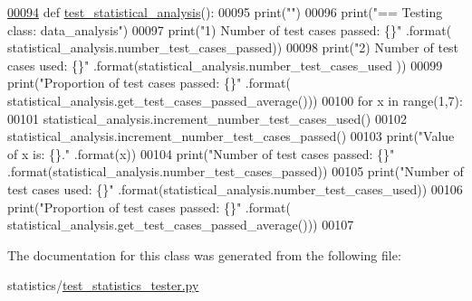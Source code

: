 \begin{DoxyCode}
\hypertarget{classstatistics_1_1test__statistics__tester_1_1statistical__analysis__tester_l00094}{}\hyperlink{classstatistics_1_1test__statistics__tester_1_1statistical__analysis__tester_ad05a0d6e83aaba083bfba6212ec0b971}{00094}     \textcolor{keyword}{def }\hyperlink{classstatistics_1_1test__statistics__tester_1_1statistical__analysis__tester_ad05a0d6e83aaba083bfba6212ec0b971}{test\_statistical\_analysis}():
00095         print(\textcolor{stringliteral}{""})
00096         print(\textcolor{stringliteral}{"==   Testing class: data\_analysis"})
00097         print(\textcolor{stringliteral}{"1) Number of test cases passed:      \{\}"} .format(
      statistical\_analysis.number\_test\_cases\_passed))
00098         print(\textcolor{stringliteral}{"2) Number of test cases used:        \{\}"} .format(statistical\_analysis.number\_test\_cases\_used
      ))
00099         print(\textcolor{stringliteral}{"Proportion of test cases passed: \{\}"} .format(
      statistical\_analysis.get\_test\_cases\_passed\_average()))
00100         \textcolor{keywordflow}{for} x \textcolor{keywordflow}{in} range(1,7):
00101             statistical\_analysis.increment\_number\_test\_cases\_used()
00102             statistical\_analysis.increment\_number\_test\_cases\_passed()
00103             print(\textcolor{stringliteral}{"Value of x is: \{\}."} .format(x))
00104             print(\textcolor{stringliteral}{"Number of test cases passed: \{\}"} .format(statistical\_analysis.number\_test\_cases\_passed))
00105             print(\textcolor{stringliteral}{"Number of test cases used:   \{\}"} .format(statistical\_analysis.number\_test\_cases\_used))
00106             print(\textcolor{stringliteral}{"Proportion of test cases passed: \{\}"} .format(
      statistical\_analysis.get\_test\_cases\_passed\_average()))
00107 \end{DoxyCode}


The documentation for this class was generated from the following file\+:\begin{DoxyCompactItemize}
\item 
statistics/\hyperlink{test__statistics__tester_8py}{test\+\_\+statistics\+\_\+tester.\+py}\end{DoxyCompactItemize}
